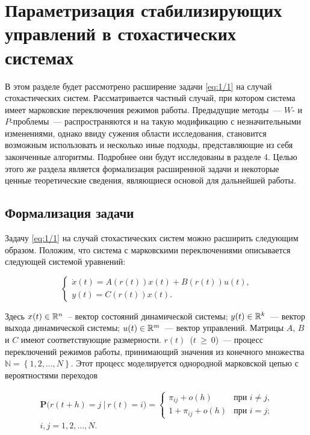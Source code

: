 \chapter[Параметризация в стохастических системах]{Параметризация стабилизирующих управлений в стохастических системах}

В этом разделе будет рассмотрено расширение задачи \vref{eq:1/1} на случай стохастических систем. Рассматривается частный случай, при котором система имеет марковские переключения режимов работы. Предыдущие методы~--- $W$- и $P$-проблемы~--- распространяются и на такую модификацию с незначительными изменениями, однако ввиду сужения области исследования, становится возможным использовать и несколько иные подходы, представляющие из себя законченные алгоритмы. Подробнее они будут исследованы в разделе 4. Целью этого же раздела является формализация расширенной задачи и некоторые ценные теоретические сведения, являющиеся основой для дальнейшей работы.\br




\section{Формализация задачи}

Задачу \vref{eq:1/1} на случай стохастических систем можно расширить следующим образом. Положим, что система с марковскими переключениями описывается следующей системой уравнений:

\begin{equation}
\label{eq:3/1}
\left\{ \begin{array}{l}
\dot{x}(t) = A\left(r(t)\right)x(t) + B\left(r(t)\right)u(t)\mbox{,} \\
y(t) = C\left(r(t)\right)x(t)\mbox{.}
\end{array} \right.
\end{equation}

Здесь $x(t) \in \mathbb{R}^{n}$~-- вектор состояний динамической системы; $y(t) \in \mathbb{R}^{k}$~--- вектор выхода динамической системы; $u(t) \in \mathbb{R}^{m}$~--- вектор управлений. Матрицы $A$, $B$ и $C$ имеют соответствующие размерности. $r(t)$~($t~\geqslant~0$)~--- процесс переключений режимов работы, принимающий значения из конечного множества $\mathbb{N} = \left\{1,2, \ldots, N\right\}$. Этот процесс моделируется однородной марковской цепью с вероятностями переходов

\begin{eqnarray}
\label{eq:3/2}
\mathbf{P}\big(r(t+h) = j~|~r(t) = i \big) = \left\{ \begin{array}{lr}
\pi_{ij} + o(h) & \mbox{при } i \not= j\mbox{,} \\
1 + \pi_{ij} + o(h) & \mbox{при } i=j\mbox{;}
\end{array} \right. \\
i,j = 1,2,\ldots,N\mbox{.} \nonumber
\end{eqnarray}

